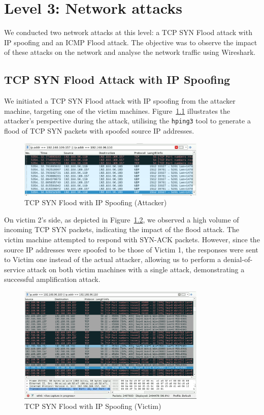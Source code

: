 \chapter{Level 3: Network attacks}
We conducted two network attacks at this level: a TCP SYN Flood attack with IP spoofing and an ICMP Flood attack. The objective was to observe the impact of these attacks on the network and analyse the network traffic using Wireshark.

\section{TCP SYN Flood Attack with IP Spoofing}
We initiated a TCP SYN Flood attack with IP spoofing from the attacker machine, targeting one of the victim machines. Figure~\ref{fig:TCPSYNFloodAttackerPOV} illustrates the attacker's perspective during the attack, utilising the \texttt{hping3} tool to generate a flood of TCP SYN packets with spoofed source IP addresses.

\begin{figure}[H]
\centering
\includegraphics[width=0.8\textwidth]{img/level3/level3-attacker-TCPSYNFlood-pov.png}
\caption{TCP SYN Flood with IP Spoofing (Attacker)}\label{fig:TCPSYNFloodAttackerPOV}
\end{figure}

On victim 2's side, as depicted in Figure~\ref{fig:TCPSYNFloodVictimPOV}, we observed a high volume of incoming TCP SYN packets, indicating the impact of the flood attack. The victim machine attempted to respond with SYN-ACK packets. However, since the source IP addresses were spoofed to be those of Victim 1, the responses were sent to Victim one instead of the actual attacker, allowing us to perform a denial-of-service attack on both victim machines with a single attack, demonstrating a successful amplification attack.

\begin{figure}[H]
\centering
\includegraphics[width=0.8\textwidth]{img/level3/level3-victim1-TCPSYNFlood-pov.png}
\caption{TCP SYN Flood with IP Spoofing (Victim)}\label{fig:TCPSYNFloodVictimPOV}
\end{figure}

